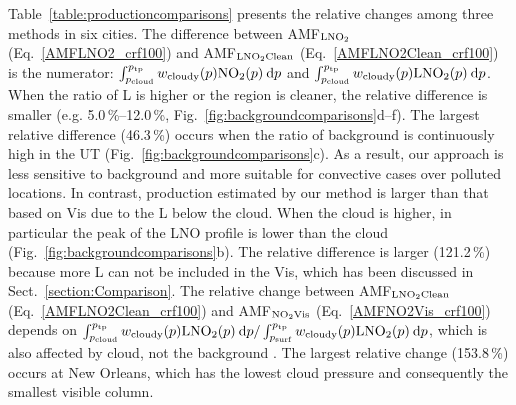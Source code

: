 \documentclass[amt]{copernicus}
\begin{document}
Table~\ref{table:productioncomparisons} presents the relative changes among three methods in six cities.
The difference between AMF$_{\chem{LNO_2}}$ (Eq.~\ref{AMFLNO2_crf100}) and AMF$_{\chem{LNO_2}\mathrm{Clean}}$ (Eq.~\ref{AMFLNO2Clean_crf100}) is the numerator: $\int_{p_\mathrm{cloud}}^{p_\mathrm{tp}} w_\mathrm{cloudy}(p) \chem{NO_2}(p) \: \mathrm{d}p$ and $\int_{p_\mathrm{cloud}}^{p_\mathrm{tp}} w_\mathrm{ cloudy}(p) \chem{LNO_2}(p) \: \mathrm{d}p$.
When the ratio of L is higher or the region is cleaner, the relative difference is smaller (e.g. 5.0\,{\%}--12.0\,{\%}, Fig.~\ref{fig:backgroundcomparisons}d--f).
The largest relative difference (46.3\,{\%}) occurs when the ratio of background  is continuously high in the UT (Fig.~\ref{fig:backgroundcomparisons}c).
As a result, our approach is less sensitive to background  and more suitable for convective cases over polluted locations.
In contrast, production estimated by our method is larger than that based on Vis due to the L below the cloud.
When the cloud is higher, in particular the peak of the LNO profile is lower than the cloud (Fig.~\ref{fig:backgroundcomparisons}b). The relative difference is larger (121.2\,{\%}) because more L can not be included in the Vis, which has been discussed in Sect.~\ref{section:Comparison}.
The relative change between AMF$_{\chem{LNO_2}\mathrm{Clean}}$ (Eq.~\ref{AMFLNO2Clean_crf100}) and AMF$_{\chem{NO_2}\mathrm{Vis}}$ (Eq.~\ref{AMFNO2Vis_crf100}) depends on $\int_{p_\mathrm{cloud}}^{p_\mathrm{tp}} w_\mathrm{cloudy}(p) \chem{LNO_2}(p) \: \mathrm{d}p / \int_{p_\mathrm{surf}}^{p_\mathrm{tp}} w_\mathrm{cloudy}(p) \chem{LNO_2}(p) \: \mathrm{d}p$, which is also affected by cloud, not the background .
The largest relative change (153.8\,{\%}) occurs at New Orleans, which has the lowest cloud pressure and consequently the smallest visible column.
\end{document}
